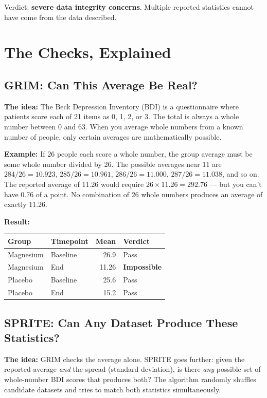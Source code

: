 \documentclass[11pt]{article}
\begin{document}
\noindent Verdict: \textbf{severe data integrity concerns}. Multiple reported statistics cannot have come from the data described.

\section{The Checks, Explained}

\subsection{GRIM: Can This Average Be Real?}

\textbf{The idea:} The Beck Depression Inventory (BDI) is a questionnaire where patients score each of 21 items as 0, 1, 2, or 3. The total is always a whole number between 0 and 63. When you average whole numbers from a known number of people, only certain averages are mathematically possible.

\textbf{Example:} If 26 people each score a whole number, the group average must be some whole number divided by 26. The possible averages near 11 are $284/26 = 10.923$, $285/26 = 10.961$, $286/26 = 11.000$, $287/26 = 11.038$, and so on. The reported average of 11.26 would require $26 \times 11.26 = 292.76$ --- but you can't have 0.76 of a point. No combination of 26 whole numbers produces an average of exactly 11.26.

\textbf{Result:}

\begin{center}
\begin{tabular}{llrl}
\toprule
\textbf{Group} & \textbf{Timepoint} & \textbf{Mean} & \textbf{Verdict} \\
\midrule
Magnesium & Baseline & 26.9 & \textcolor{pass}{Pass} \\
Magnesium & End & 11.26 & \textcolor{fail}{\textbf{Impossible}} \\
Placebo & Baseline & 25.6 & \textcolor{pass}{Pass} \\
Placebo & End & 15.2 & \textcolor{pass}{Pass} \\
\bottomrule
\end{tabular}
\end{center}

\subsection{SPRITE: Can Any Dataset Produce These Statistics?}

\textbf{The idea:} GRIM checks the average alone. SPRITE goes further: given the reported average \textit{and} the spread (standard deviation), is there \textit{any} possible set of whole-number BDI scores that produces both? The algorithm randomly shuffles candidate datasets and tries to match both statistics simultaneously.
\end{document}
